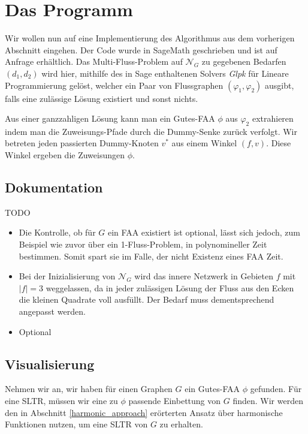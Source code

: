 \chapter{Das Programm}\label{the_program}

Wir wollen nun auf eine Implementierung des Algorithmus aus dem vorherigen Abschnitt eingehen. Der Code wurde in SageMath \cite{sage} geschrieben und ist auf Anfrage erhältlich. Das Multi-Fluss-Problem auf $\mathcal{N}_G$ zu gegebenen Bedarfen $(d_1,d_2)$ wird hier, mithilfe des in Sage enthaltenen Solvers \textit{Glpk} \cite{glpk} für Lineare Programmierung gelöst, welcher ein Paar von Flussgraphen $(\varphi_1,\varphi_2)$ ausgibt, falls eine zulässige Lösung existiert und sonst nichts.



Aus einer ganzzahligen Lösung kann man ein Gutes-FAA $\phi$ aus $\varphi_2$ extrahieren indem man die Zuweisungs-Pfade durch die Dummy-Senke zurück verfolgt. Wir betreten jeden passierten Dummy-Knoten $v^*$ aus einem Winkel $(f,v)$. Diese Winkel ergeben die Zuweisungen $\phi$.

\section{Dokumentation}

TODO

\begin{itemize}
\item Die Kontrolle, ob für $G$ ein FAA existiert ist optional, lässt sich jedoch, zum Beispiel wie zuvor über ein 1-Fluss-Problem, in polynomineller Zeit bestimmen. Somit spart sie im Falle, der nicht Existenz eines FAA Zeit. 
\item Bei der Inizialisierung von $\mathcal{N}_G$ wird das innere Netzwerk in Gebieten $f$ mit $|f|=3$ weggelassen, da in jeder zulässigen Lösung der Fluss aus den Ecken die kleinen Quadrate voll ausfüllt. Der Bedarf muss dementsprechend angepasst werden.
\item  Optional 
\end{itemize}

\section{Visualisierung}

Nehmen wir an, wir haben für einen Graphen $G$ ein Gutes-FAA $\phi$ gefunden. Für eine SLTR, müssen wir eine zu $\phi$ passende Einbettung von $G$ finden. Wir werden den in Abschnitt \ref{harmonic_approach} erörterten Ansatz über harmonische Funktionen nutzen, um eine SLTR von $G$ zu erhalten.

